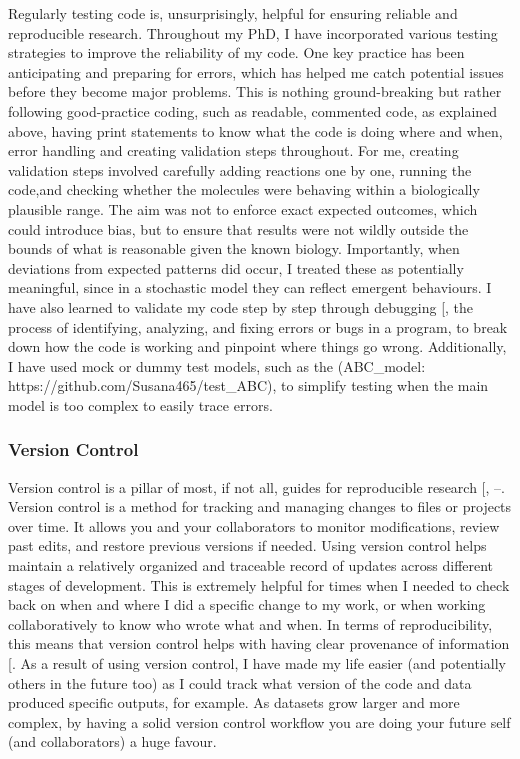 \documentclass[
  11pt,
  letterpaper,
]{scrreprt}
\begin{document}
Regularly testing code is, unsurprisingly, helpful for ensuring reliable
and reproducible research. Throughout my PhD, I have incorporated
various testing strategies to improve the reliability of my code. One
key practice has been anticipating and preparing for errors, which has
helped me catch potential issues before they become major problems. This
is nothing ground-breaking but rather following good-practice coding,
such as readable, commented code, as explained above, having print
statements to know what the code is doing where and when, error handling
and creating validation steps throughout. For me, creating validation
steps involved carefully adding reactions one by one, running the
code,and checking whether the molecules were behaving within a
biologically plausible range. The aim was not to enforce exact expected
outcomes, which could introduce bias, but to ensure that results were
not wildly outside the bounds of what is reasonable given the known
biology. Importantly, when deviations from expected patterns did occur,
I treated these as potentially meaningful, since in a stochastic model
they can reflect emergent behaviours. I have also learned to validate my
code step by step through debugging
{[}\citeproc{ref-mccauley2008Debugging}{386}{]}, the process of
identifying, analyzing, and fixing errors or bugs in a program, to break
down how the code is working and pinpoint where things go wrong.
Additionally, I have used mock or dummy test models, such as the
(ABC\_model: https://github.com/Susana465/test\_ABC), to simplify
testing when the main model is too complex to easily trace errors.

\subsubsection*{Version Control}\label{version-control}

Version control is a pillar of most, if not all, guides for reproducible
research {[},
--\citeproc{ref-hamra2025Advancing}{391}{]}.
Version control is a method for tracking and managing changes to files
or projects over time. It allows you and your collaborators to monitor
modifications, review past edits, and restore previous versions if
needed. Using version control helps maintain a relatively organized and
traceable record of updates across different stages of development. This
is extremely helpful for times when I needed to check back on when and
where I did a specific change to my work, or when working
collaboratively to know who wrote what and when. In terms of
reproducibility, this means that version control helps with having clear
provenance of information {[}\citeproc{ref-hamra2025Advancing}{391}{]}.
As a result of using version control, I have made my life easier (and
potentially others in the future too) as I could track what version of
the code and data produced specific outputs, for example. As datasets
grow larger and more complex, by having a solid version control workflow
you are doing your future self (and collaborators) a huge favour.
\end{document}
